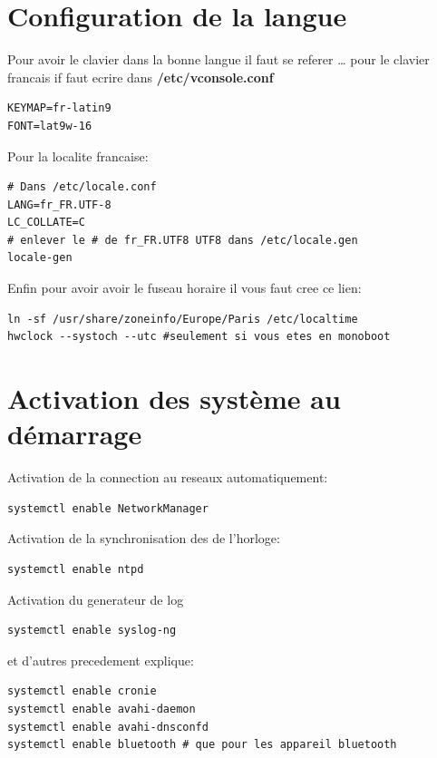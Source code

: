 \documentclass[a4paper]{book}
\begin{document}
\chapter{Configuration de la langue}
Pour avoir le clavier dans la bonne langue il faut se referer \ldots
pour le clavier francais if faut ecrire dans \textbf{/etc/vconsole.conf}
\begin{verbatim}
KEYMAP=fr-latin9
FONT=lat9w-16
\end{verbatim}
Pour la localite francaise\@:
\begin{verbatim}
# Dans /etc/locale.conf
LANG=fr_FR.UTF-8
LC_COLLATE=C
# enlever le # de fr_FR.UTF8 UTF8 dans /etc/locale.gen
locale-gen
\end{verbatim}
Enfin pour avoir avoir le fuseau horaire il vous faut cree ce lien\@:
\begin{verbatim}
ln -sf /usr/share/zoneinfo/Europe/Paris /etc/localtime
hwclock --systoch --utc #seulement si vous etes en monoboot
\end{verbatim}
\chapter{Activation des système au démarrage}
Activation de la connection au reseaux automatiquement\@:
\begin{verbatim}
systemctl enable NetworkManager
\end{verbatim}
Activation de la synchronisation des de l'horloge\@:
\begin{verbatim}
systemctl enable ntpd
\end{verbatim}
Activation du  generateur de log
\begin{verbatim}
systemctl enable syslog-ng
\end{verbatim}
et d'autres precedement explique\@:
\begin{verbatim}
systemctl enable cronie
systemctl enable avahi-daemon
systemctl enable avahi-dnsconfd
systemctl enable bluetooth # que pour les appareil bluetooth
\end{verbatim}
\end{document}
